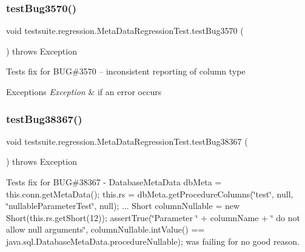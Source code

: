 \subsubsection{\texorpdfstring{test\+Bug3570()}{testBug3570()}}
{\footnotesize\ttfamily void testsuite.\+regression.\+Meta\+Data\+Regression\+Test.\+test\+Bug3570 (\begin{DoxyParamCaption}{ }\end{DoxyParamCaption}) throws Exception}

Tests fix for B\+UG\#3570 -- inconsistent reporting of column type


\begin{DoxyExceptions}{Exceptions}
{\em Exception} & if an error occurs \\
\hline
\end{DoxyExceptions}
\mbox{\label{classtestsuite_1_1regression_1_1_meta_data_regression_test_a8ef9287c41ad42ae8faf6e7bb34a6fcb}} 
\subsubsection{\texorpdfstring{test\+Bug38367()}{testBug38367()}}
{\footnotesize\ttfamily void testsuite.\+regression.\+Meta\+Data\+Regression\+Test.\+test\+Bug38367 (\begin{DoxyParamCaption}{ }\end{DoxyParamCaption}) throws Exception}

Tests fix for B\+UG\#38367 -\/ Database\+Meta\+Data db\+Meta = this.\+conn.\+get\+Meta\+Data(); this.\+rs = db\+Meta.\+get\+Procedure\+Columns(\char`\"{}test\char`\"{}, null, \char`\"{}nullable\+Parameter\+Test\char`\"{}, null); ... Short column\+Nullable = new Short(this.\+rs.\+get\+Short(12)); assert\+True(\char`\"{}\+Parameter \char`\"{} + column\+Name + \char`\"{} do not allow null arguments\char`\"{}, column\+Nullable.\+int\+Value() == java.\+sql.\+Database\+Meta\+Data.\+procedure\+Nullable); was failing for no good reason.



